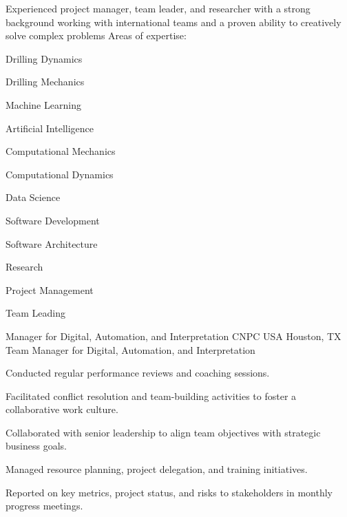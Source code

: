 \documentclass{leresume}
\begin{document}
	\thispagestyle{leempty}
	\makeresumeheaderC

	Experienced project manager, team leader, and researcher with a strong background working with international teams and a proven ability to creatively solve complex problems Areas of expertise:
	\vspace{-6pt}
	\begin{multicols}{3}
		\begin{bulletedlist}
			
			\item Drilling Dynamics
			\item Drilling Mechanics
			\item Machine Learning
			\item Artificial Intelligence
			\item Computational Mechanics
			\item Computational Dynamics
			\item Data Science
			\item Software Development
			\item Software Architecture
			\item Research
			\item Project Management
			\item Team Leading
		\end{bulletedlist}
		\end{multicols}

	
		
            {Manager for Digital, Automation, and Interpretation}
            {CNPC USA}
			{Houston, TX}
			Team Manager for Digital, Automation, and Interpretation
		\begin{bulletedlist}
			
		\item
		
				Conducted regular performance reviews and coaching sessions.
			
		\item
		
				Facilitated conflict resolution and team-building activities to foster a collaborative work culture.
			
		\item
		
				Collaborated with senior leadership to align team objectives with strategic business goals.
			
		\item
		
				Managed resource planning, project delegation, and training initiatives.
			
		\item
		
				Reported on key metrics, project status, and risks to stakeholders in monthly progress meetings.
			
		\end{bulletedlist}
	
\end{document}
